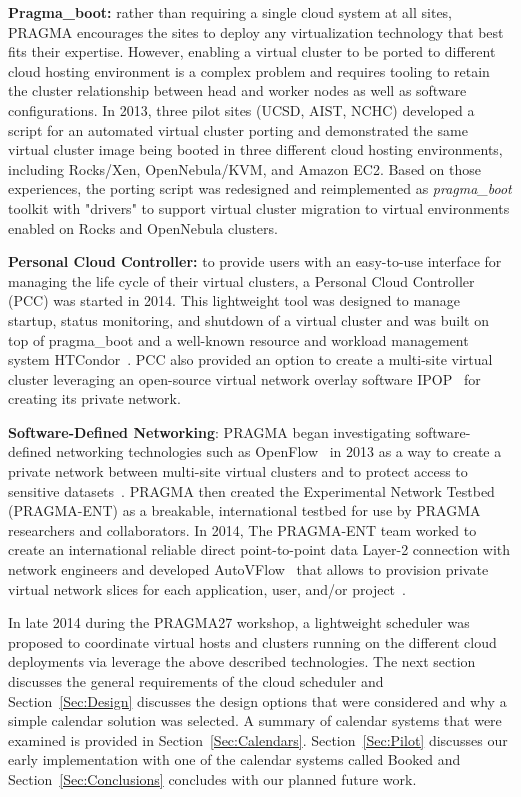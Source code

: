\documentclass{acm_proc_article-sp}
\begin{document}
\textbf{Pragma\_boot:}  rather than requiring a single cloud system at all sites, PRAGMA encourages the sites to  deploy any virtualization technology that best fits their expertise. However, enabling a virtual cluster to be ported to different cloud hosting environment is a complex problem and requires tooling to retain the cluster relationship between head and worker nodes as well as software configurations.  In 2013, three pilot sites (UCSD, AIST, NCHC) developed a script for an automated virtual cluster porting and demonstrated the same virtual cluster image being booted in three different cloud hosting environments, including Rocks/Xen, OpenNebula/KVM, and Amazon EC2.  Based on those experiences, the porting script was redesigned and reimplemented as \textit{pragma\_boot} toolkit with "drivers" to support  virtual cluster migration to virtual environments enabled on Rocks and OpenNebula clusters.

\textbf{Personal Cloud Controller:}  to provide users with an easy-to-use interface for managing the life cycle of their virtual clusters, a Personal Cloud Controller (PCC)  was started in 2014. This lightweight tool was designed to manage startup, status monitoring, and shutdown of a virtual cluster and was built on top of pragma\_boot and a well-known resource and workload management system HTCondor~\cite{condor}.   PCC also provided an option to create a multi-site virtual cluster leveraging an open-source virtual network overlay software IPOP~\cite{ipop} for creating its private network.

\textbf{Software-Defined Networking}:   PRAGMA began investigating software-defined networking technologies such as OpenFlow~\cite{openflow} in 2013 as a way to create a private network between multi-site virtual clusters and to protect access to sensitive datasets~\cite{pragmaReport2013}.  PRAGMA then created the Experimental Network Testbed (PRAGMA-ENT) as a breakable, international testbed for use by PRAGMA researchers and collaborators.  In 2014, The PRAGMA-ENT team worked to create an international reliable direct point-to-point data Layer-2 connection with network engineers and developed AutoVFlow~\cite{autovflow} that allows to provision private virtual network slices for each application, user, and/or project~\cite{pragmaReport2014}.  

In late 2014 during the PRAGMA27 workshop, a lightweight scheduler was proposed to coordinate virtual hosts and clusters running on the different cloud deployments via leverage the above described technologies.  The next section discusses the general requirements of the cloud scheduler and Section~\ref{Sec:Design} discusses the design options that were considered and why a simple calendar solution was selected.  A summary of calendar systems that were examined is provided in Section~\ref{Sec:Calendars}.  Section~\ref{Sec:Pilot} discusses our early implementation with one of the calendar systems called Booked and Section~\ref{Sec:Conclusions} concludes with our planned future work.  
\end{document}
